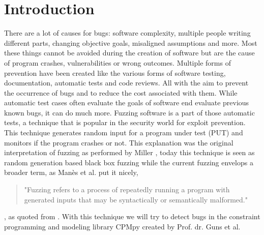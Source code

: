 \chapter{Introduction}
\label{cha:intro}
There are a lot of causes for bugs: software complexity, multiple people writing different parts, changing objective goals, misaligned assumptions and more. Most these things cannot be avoided during the creation of software but are the cause of program crashes, vulnerabilities or wrong outcomes. Multiple forms of prevention have been created like the various forms of software testing, documentation, automatic tests and code reviews. All with the aim to prevent the occurrence of bugs and to reduce the cost associated with them. While automatic test cases often evaluate the goals of software end evaluate previous known bugs, it can do much more. Fuzzing software is a part of those automatic tests, a technique that is popular in the security world for exploit prevention. This technique generates random input for a program under test (PUT) and monitors if the program crashes or not. This explanation was the original interpretation of fuzzing as performed by Miller \cite{4originalFuzzingUnixUtils}, today this technique is seen as random generation based black box fuzzing while the current fuzzing envelops a broader term, as Man\`es et al. \cite{13manes2019survey} put it nicely,
\begin{quote}
"Fuzzing refers to a process of repeatedly running a program with generated inputs that may be syntactically or semantically malformed."
\end{quote}, as quoted from \cite{13manes2019survey}.
With this technique we will try to detect bugs in the constraint programming and modeling library CPMpy \cite{17guns2019increasing} created by Prof. dr. Guns et al.


